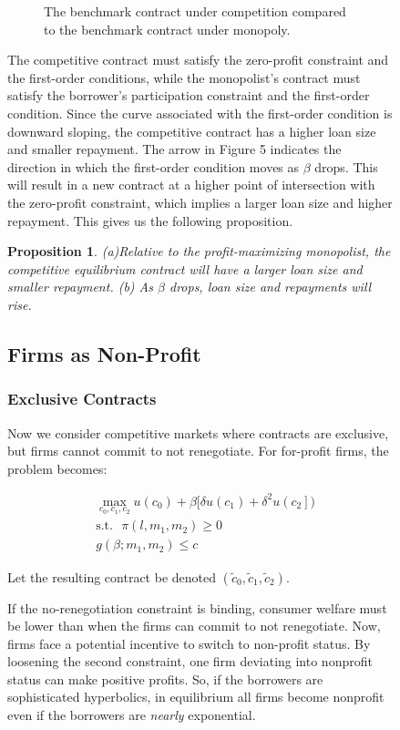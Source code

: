 \documentclass[11pt]{article}%
\newtheorem{proposition}{Proposition}
\begin{document}
\begin{figure}
{\begin{figure}[ptb]
\caption{The benchmark contract under competition compared to the benchmark
contract under monopoly.}%
\end{figure}


The competitive contract must satisfy the zero-profit constraint and the
first-order conditions, while the monopolist's contract must satisfy the
borrower's participation constraint and the first-order condition. Since the
curve associated with the first-order condition is downward sloping, the
competitive contract has a higher loan size and smaller repayment. The arrow
in Figure 5 indicates the direction in which the first-order condition moves
as $\beta$ drops. This will result in a new contract at a higher point of
intersection with the zero-profit constraint, which implies a larger loan size
and higher repayment. This gives us the following proposition.

\begin{proposition}
(a)Relative to the profit-maximizing monopolist, the competitive equilibrium
contract will have a larger loan size and smaller repayment. (b) As $\beta$
drops, loan size and repayments will rise.
\end{proposition}

\subsection{Firms as Non-Profit}

\subsubsection{Exclusive Contracts}

Now we consider competitive markets where contracts are exclusive, but firms
cannot commit to not renegotiate. For for-profit firms, the problem becomes:%

\begin{align*}
&  \max_{c_{0},c_{1},c_{2}}u\left(  c_{0}\right)  +\beta[\delta u\left (c_{1}%
\right)  +\delta^{2}u\left(  c_{2}\right]) \\
&  \text{s}\text{.t}\text{.}\text{ }\pi\left(  l,m_{1},m_{2}\right)  \geq0\\
&  g\left(  \beta;m_{1},m_{2}\right)  \leq c
\end{align*}


Let the resulting contract be denoted $\left(  \tilde{c}_{0},\tilde{c}%
_{1},\tilde{c}_{2}\right)  $.

If the no-renegotiation constraint is binding, consumer welfare must be lower
than when the firms can commit to not renegotiate. Now, firms face a potential
incentive to switch to non-profit status. By loosening the second constraint,
one firm deviating into nonprofit status can make positive profits. So, if the
borrowers are sophisticated hyperbolics, in equilibrium all firms become
nonprofit even if the borrowers are \textit{nearly} exponential.

}
\end{figure}
\end{document}
